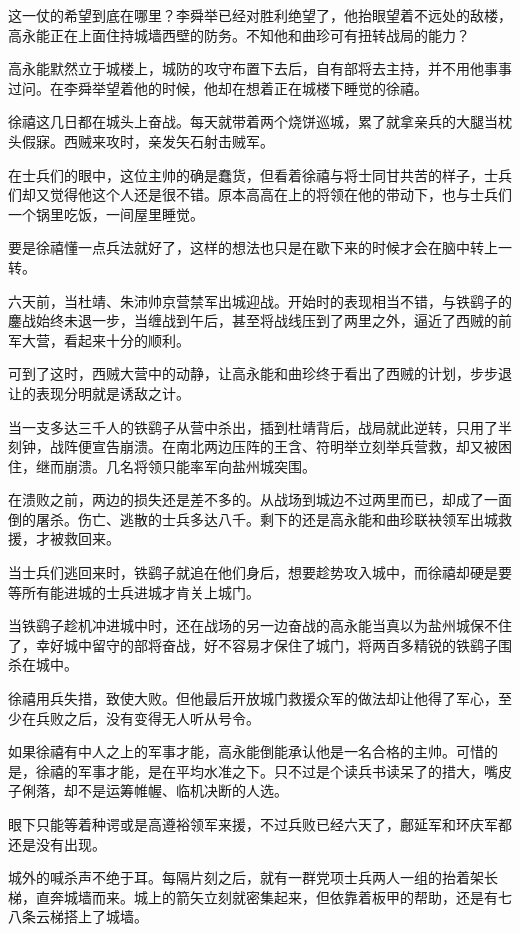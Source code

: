 这一仗的希望到底在哪里？李舜举已经对胜利绝望了，他抬眼望着不远处的敌楼，高永能正在上面住持城墙西壁的防务。不知他和曲珍可有扭转战局的能力？

高永能默然立于城楼上，城防的攻守布置下去后，自有部将去主持，并不用他事事过问。在李舜举望着他的时候，他却在想着正在城楼下睡觉的徐禧。

徐禧这几日都在城头上奋战。每天就带着两个烧饼巡城，累了就拿亲兵的大腿当枕头假寐。西贼来攻时，亲发矢石射击贼军。

在士兵们的眼中，这位主帅的确是蠢货，但看着徐禧与将士同甘共苦的样子，士兵们却又觉得他这个人还是很不错。原本高高在上的将领在他的带动下，也与士兵们一个锅里吃饭，一间屋里睡觉。

要是徐禧懂一点兵法就好了，这样的想法也只是在歇下来的时候才会在脑中转上一转。

六天前，当杜靖、朱沛帅京营禁军出城迎战。开始时的表现相当不错，与铁鹞子的鏖战始终未退一步，当缠战到午后，甚至将战线压到了两里之外，逼近了西贼的前军大营，看起来十分的顺利。

可到了这时，西贼大营中的动静，让高永能和曲珍终于看出了西贼的计划，步步退让的表现分明就是诱敌之计。

当一支多达三千人的铁鹞子从营中杀出，插到杜靖背后，战局就此逆转，只用了半刻钟，战阵便宣告崩溃。在南北两边压阵的王含、符明举立刻举兵营救，却又被困住，继而崩溃。几名将领只能率军向盐州城突围。

在溃败之前，两边的损失还是差不多的。从战场到城边不过两里而已，却成了一面倒的屠杀。伤亡、逃散的士兵多达八千。剩下的还是高永能和曲珍联袂领军出城救援，才被救回来。

当士兵们逃回来时，铁鹞子就追在他们身后，想要趁势攻入城中，而徐禧却硬是要等所有能进城的士兵进城才肯关上城门。

当铁鹞子趁机冲进城中时，还在战场的另一边奋战的高永能当真以为盐州城保不住了，幸好城中留守的部将奋战，好不容易才保住了城门，将两百多精锐的铁鹞子围杀在城中。

徐禧用兵失措，致使大败。但他最后开放城门救援众军的做法却让他得了军心，至少在兵败之后，没有变得无人听从号令。

如果徐禧有中人之上的军事才能，高永能倒能承认他是一名合格的主帅。可惜的是，徐禧的军事才能，是在平均水准之下。只不过是个读兵书读呆了的措大，嘴皮子俐落，却不是运筹帷幄、临机决断的人选。

眼下只能等着种谔或是高遵裕领军来援，不过兵败已经六天了，鄜延军和环庆军都还是没有出现。

城外的喊杀声不绝于耳。每隔片刻之后，就有一群党项士兵两人一组的抬着架长梯，直奔城墙而来。城上的箭矢立刻就密集起来，但依靠着板甲的帮助，还是有七八条云梯搭上了城墙。

